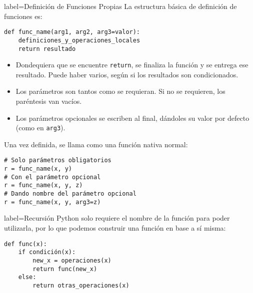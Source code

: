 \begin{contentbox}{label=Definición de Funciones Propias}
    La estructura básica de definición de funciones es:
\begin{lstlisting}
def func_name(arg1, arg2, arg3=valor):
    definiciones_y_operaciones_locales
    return resultado
\end{lstlisting}

    \begin{itemize}
        \item Dondequiera que se encuentre \lstinline!return!, se finaliza la función y se entrega ese resultado. Puede haber varios, según si los resultados son condicionados.
        \item Los parámetros son tantos como se requieran. Si no se requieren, los paréntesis van vacíos.
        \item Los parámetros opcionales se escriben al final, dándoles su valor por defecto (como en \verb|arg3|).%
    \end{itemize}

    Una vez definida, se llama como una función nativa normal:
\begin{lstlisting}
# Solo parámetros obligatorios
r = func_name(x, y)
# Con el parámetro opcional
r = func_name(x, y, z)
# Dando nombre del parámetro opcional
r = func_name(x, y, arg3=z)
\end{lstlisting}
\end{contentbox}

\begin{contentbox}{label=Recursión}
    Python solo requiere el nombre de la función para poder utilizarla, por lo que podemos construir una función en base a sí misma:
\begin{lstlisting}
def func(x):
    if condición(x):
        new_x = operaciones(x)
        return func(new_x)
    else:
        return otras_operaciones(x)
\end{lstlisting}
\end{contentbox}

